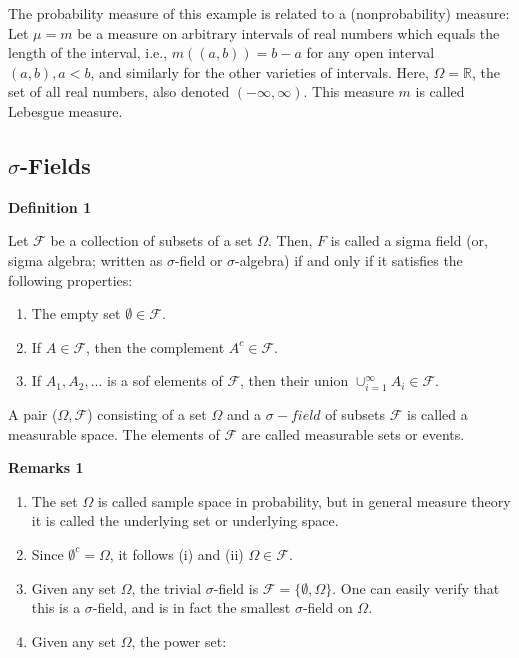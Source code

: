 \documentclass[]{book}
\begin{document}
The probability measure of this example is related to a (nonprobability) measure: Let \(\mu=m\) be a measure on arbitrary intervals of real numbers which equals the length of the interval, i.e., \(m((a,b))=b-a\) for any open interval \((a,b),a<b\), and similarly for the other varieties of intervals. Here, \(\Omega=\mathbb{R}\), the set of all real numbers, also denoted \((-\infty, \infty)\). This measure \(m\) is called Lebesgue measure.

\hypertarget{sigma-fields}{%
\subsection{\texorpdfstring{\(\sigma\)-Fields}{\textbackslash{}sigma-Fields}}\label{sigma-fields}}

\textbf{Definition 1}

Let \(\mathcal{F}\) be a collection of subsets of a set \(\Omega\). Then, \(F\) is called a sigma field (or, sigma algebra; written as \(\sigma\)-field or \(\sigma\)-algebra) if and only if it satisfies the following properties:

\begin{enumerate}
\def\labelenumi{(\roman{enumi})}
\item
  The empty set \(\emptyset \in \mathcal{F}\).
\item
  If \(A \in \mathcal{F}\), then the complement \(A^c \in \mathcal{F}\).
\item
  If \(A_1, A_2,...\) is a sof elements of \(\mathcal{F}\), then their union \(\cup_{i=1}^\infty A_i \in \mathcal{F}\).
\end{enumerate}

A pair (\(\Omega, \mathcal{F}\)) consisting of a set \(\Omega\) and a \(\sigma-field\) of subsets \(\mathcal{F}\) is called a measurable space. The elements of \(\mathcal{F}\) are called measurable sets or events.

\textbf{Remarks 1}

\begin{enumerate}
\def\labelenumi{(\arabic{enumi})}
\item
  The set \(\Omega\) is called sample space in probability, but in general measure theory it is called the underlying set or underlying space.
\item
  Since \(\emptyset^c=\Omega\), it follows (i) and (ii) \(\Omega \in \mathcal{F}\).
\item
  Given any set \(\Omega\), the trivial \(\sigma\)-field is \(\mathcal{F}=\{ \emptyset, \Omega\}\). One can easily verify that this is a \(\sigma\)-field, and is in fact the smallest \(\sigma\)-field on \(\Omega\).
\item
  Given any set \(\Omega\), the power set:
\end{enumerate}
\end{document}
